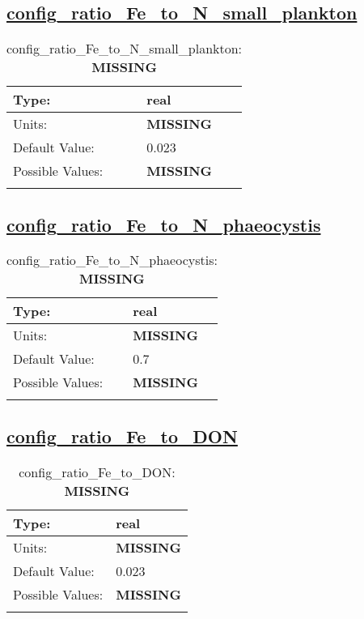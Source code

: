 \subsection[config\_ratio\_Fe\_to\_N\_small\_plankton]{\hyperref[sec:nm_tab_biogeochemistry]{config\_ratio\_Fe\_to\_N\_small\_plankton}}
\label{subsec:nm_sec_config_ratio_Fe_to_N_small_plankton}
\begin{center}
\begin{longtable}{| p{2.0in} || p{4.0in} |}
    \hline
    Type: & real \\
    \hline
    Units: & {\bf \color{red} MISSING} \\
    \hline
    Default Value: & 0.023 \\
    \hline
    Possible Values: & {\bf \color{red} MISSING} \\
    \hline
    \caption{config\_ratio\_Fe\_to\_N\_small\_plankton: {\bf \color{red} MISSING}}
\end{longtable}
\end{center}
\subsection[config\_ratio\_Fe\_to\_N\_phaeocystis]{\hyperref[sec:nm_tab_biogeochemistry]{config\_ratio\_Fe\_to\_N\_phaeocystis}}
\label{subsec:nm_sec_config_ratio_Fe_to_N_phaeocystis}
\begin{center}
\begin{longtable}{| p{2.0in} || p{4.0in} |}
    \hline
    Type: & real \\
    \hline
    Units: & {\bf \color{red} MISSING} \\
    \hline
    Default Value: & 0.7 \\
    \hline
    Possible Values: & {\bf \color{red} MISSING} \\
    \hline
    \caption{config\_ratio\_Fe\_to\_N\_phaeocystis: {\bf \color{red} MISSING}}
\end{longtable}
\end{center}
\subsection[config\_ratio\_Fe\_to\_DON]{\hyperref[sec:nm_tab_biogeochemistry]{config\_ratio\_Fe\_to\_DON}}
\label{subsec:nm_sec_config_ratio_Fe_to_DON}
\begin{center}
\begin{longtable}{| p{2.0in} || p{4.0in} |}
    \hline
    Type: & real \\
    \hline
    Units: & {\bf \color{red} MISSING} \\
    \hline
    Default Value: & 0.023 \\
    \hline
    Possible Values: & {\bf \color{red} MISSING} \\
    \hline
    \caption{config\_ratio\_Fe\_to\_DON: {\bf \color{red} MISSING}}
\end{longtable}
\end{center}
